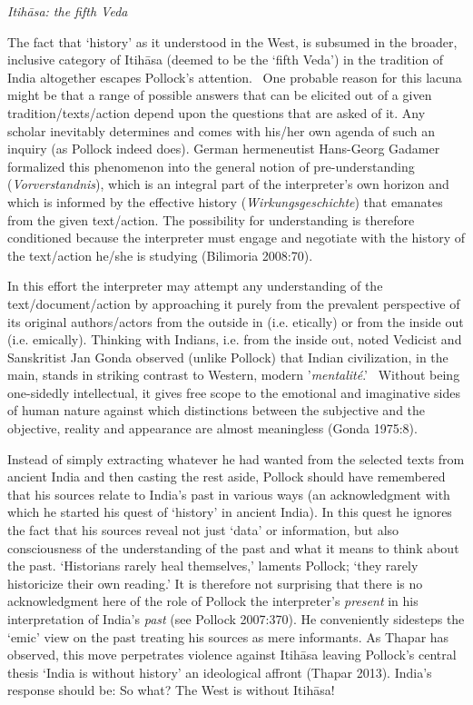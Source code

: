 \textit{Itihāsa: the fifth Veda}

The fact that ‘history’ as it understood in the West, is subsumed in the broader, inclusive category of Itihāsa (deemed to be the ‘fifth Veda’) in the tradition of India altogether escapes Pollock’s attention.  One probable reason for this lacuna might be that a range of possible answers that can be elicited out of a given tradition/texts/action depend upon the questions that are asked of it. Any scholar inevitably determines and comes with his/her own agenda of such an inquiry (as Pollock indeed does). German hermeneutist Hans-Georg Gadamer formalized this phenomenon into the general notion of pre-understanding (\textit{Vorverstandnis}), which is an integral part of the interpreter’s own horizon and which is informed by the effective history (\textit{Wirkungsgeschichte}) that emanates from the given text/action. The possibility for understanding is therefore conditioned because the interpreter must engage and negotiate with the history of the text/action he/she is studying (Bilimoria 2008:70). 

In this effort the interpreter may attempt any understanding of the text/document/action by approaching it purely from the prevalent perspective of its original authors/actors from the outside in (i.e. etically) or from the inside out (i.e. emically). Thinking with Indians, i.e. from the inside out, noted Vedicist and Sanskritist Jan Gonda observed (unlike Pollock) that Indian civilization, in the main, stands in striking contrast to Western, modern '\textit{mentalité}.'  Without being one-sidedly intellectual, it gives free scope to the emotional and imaginative sides of human nature against which distinctions between the subjective and the objective, reality and appearance are almost meaningless (Gonda 1975:8).

Instead of simply extracting whatever he had wanted from the selected texts from ancient India and then casting the rest aside, Pollock should have remembered that his sources relate to India’s past in various ways (an acknowledgment with which he started his quest of ‘history’ in ancient India). In this quest he ignores the fact that his sources reveal not just ‘data’ or information, but also consciousness of the understanding of the past and what it means to think about the past. ‘Historians rarely heal themselves,’ laments Pollock; ‘they rarely historicize their own reading.’ It is therefore not surprising that there is no acknowledgment here of the role of Pollock the interpreter’s \textit{present} in his interpretation of India’s \textit{past} (see Pollock 2007:370). He conveniently sidesteps the ‘emic’ view on the past treating his sources as mere informants. As Thapar has observed, this move perpetrates violence against Itihāsa leaving Pollock’s central thesis ‘India is without history’ an ideological affront (Thapar 2013). India’s response should be: So what? The West is without Itihāsa! 


